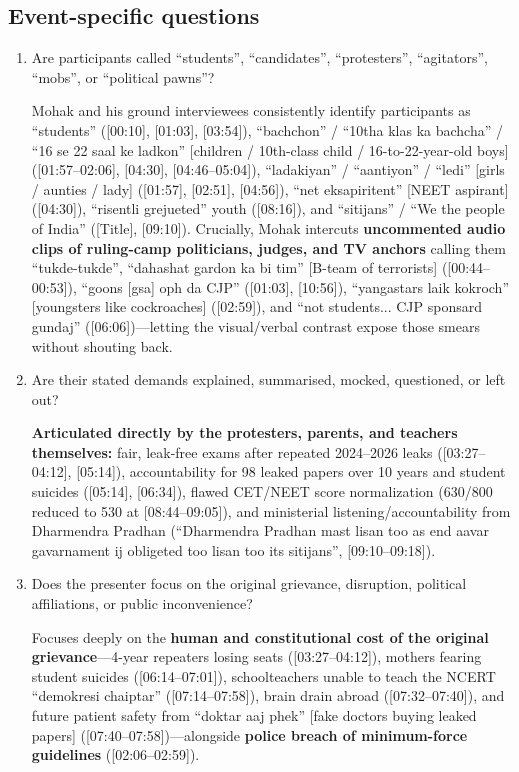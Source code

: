 \documentclass[10pt,a4paper]{article}
\begin{document}
\subsection*{Event-specific questions}
{\small
\begin{enumerate}[leftmargin=1.5em, itemsep=6pt, topsep=4pt]
  \item Are participants called ``students'', ``candidates'', ``protesters'', ``agitators'', ``mobs'', or ``political pawns''?\par\smallskip
  Mohak and his ground interviewees consistently identify participants as ``students'' ([00:10], [01:03], [03:54]), ``bachchon'' / ``10tha klas ka bachcha'' / ``16 se 22 saal ke ladkon'' [children / 10th-class child / 16-to-22-year-old boys] ([01:57--02:06], [04:30], [04:46--05:04]), ``ladakiyan'' / ``aantiyon'' / ``ledi'' [girls / aunties / lady] ([01:57], [02:51], [04:56]), ``net eksapiritent'' [NEET aspirant] ([04:30]), ``risentli grejueted'' youth ([08:16]), and ``sitijans'' / ``We the people of India'' ([Title], [09:10]). Crucially, Mohak intercuts \textbf{uncommented audio clips of ruling-camp politicians, judges, and TV anchors} calling them ``tukde-tukde'', ``dahashat gardon ka bi tim'' [B-team of terrorists] ([00:44--00:53]), ``goons [gsa] oph da CJP'' ([01:03], [10:56]), ``yangastars laik kokroch'' [youngsters like cockroaches] ([02:59]), and ``not students... CJP sponsard gundaj'' ([06:06])---letting the visual/verbal contrast expose those smears without shouting back.
  \item Are their stated demands explained, summarised, mocked, questioned, or left out?\par\smallskip
  \textbf{Articulated directly by the protesters, parents, and teachers themselves:} fair, leak-free exams after repeated 2024--2026 leaks ([03:27--04:12], [05:14]), accountability for 98 leaked papers over 10 years and student suicides ([05:14], [06:34]), flawed CET/NEET score normalization (630/800 reduced to 530 at [08:44--09:05]), and ministerial listening/accountability from Dharmendra Pradhan (``Dharmendra Pradhan mast lisan too as end aavar gavarnament ij obligeted too lisan too its sitijans'', [09:10--09:18]).
  \item Does the presenter focus on the original grievance, disruption, political affiliations, or public inconvenience?\par\smallskip
  Focuses deeply on the \textbf{human and constitutional cost of the original grievance}---4-year repeaters losing seats ([03:27--04:12]), mothers fearing student suicides ([06:14--07:01]), schoolteachers unable to teach the NCERT ``demokresi chaiptar'' ([07:14--07:58]), brain drain abroad ([07:32--07:40]), and future patient safety from ``doktar aaj phek'' [fake doctors buying leaked papers] ([07:40--07:58])---alongside \textbf{police breach of minimum-force guidelines} ([02:06--02:59]).

\end{enumerate}}
\end{document}
